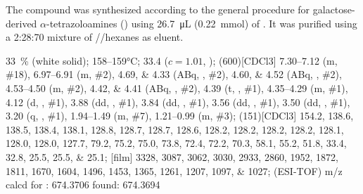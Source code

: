 The compound was synthesized according to the general procedure for galactose-derived $\alpha$-tetrazoloamines () using \SI{26.7}{\micro\liter} (\SI{0.22}{\milli\mol}) of .
It was purified using a 2:28:70 mixture of //hexanes as eluent.
\begin{fullexp}
	 \SI{33}{\percent} (white solid); 
	 \numrange{158}{159}\si{\celsius}; 
	\data{[$\alpha^{23}_D$]~$=$} \num{33.4} ($c = 1.01$, ); 
	\NMR(600)[CDCl3] \numrange{7.30}{7.12} (m, \#{18}), \numrange{6.97}{6.91} (m, \#{2}), \numlist{4.69;4.33} (ABq, , \#{2}), \numlist{4.60;4.52} (ABq, , \#{2}), \numrange{4.53}{4.50} (m, \#{2}), \numlist{4.42;4.41} (ABq, , \#{2}), \num{4.39} (t, , \#{1}), \numrange{4.35}{4.29} (m, \#{1}), \num{4.12} (d, , \#{1}), \num{3.88} (dd, , \#{1}), \num{3.84} (dd, , \#{1}), \num{3.56} (dd, , \#{1}), \num{3.50} (dd, , \#{1}), \num{3.20} (q, , \#{1}), \numrange{1.94}{1.49} (m, \#{7}), \numrange{1.21}{0.99} (m, \#{3}); 
	(151)[CDCl3] \numlist{154.2; 138.6; 138.5; 138.4; 138.1; 128.8; 128.7; 128.7; 128.6; 128.2; 128.2; 128.2; 128.2; 128.1; 128.0; 128.0; 127.7; 79.2; 75.2; 75.0; 73.8; 72.4; 72.2; 70.3; 58.1; 55.2; 51.8; 33.4; 32.8; 25.5; 25.5; 25.1}; 
	[film] \numlist{3328; 3087; 3062; 3030; 2933; 2860; 1952; 1872; 1811; 1670; 1604; 1496; 1453; 1365; 1261; 1207; 1097; 1027}; 
	 (ESI-TOF) m/z calcd for : \num{674.3706} found: \num{674.3694}
\end{fullexp}

